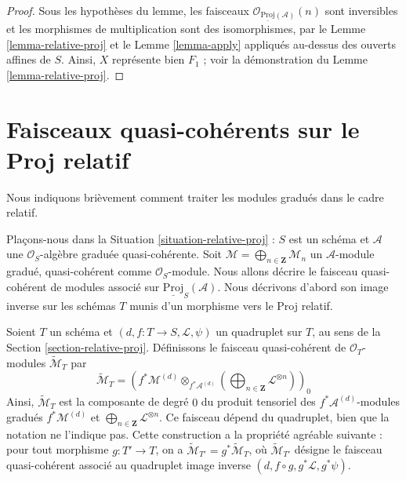 \begin{proof}
Sous les hypothèses du lemme, les faisceaux
$\mathcal{O}_{\underline{\text{Proj}}(\mathcal{A})}(n)$ sont inversibles
et les morphismes de multiplication sont des isomorphismes, par le
Lemme \ref{lemma-relative-proj} et le Lemme \ref{lemma-apply} appliqués
au-dessus des ouverts affines de $S$. Ainsi, $X$ représente bien $F_1$ ;
voir la démonstration du Lemme \ref{lemma-relative-proj}.
\end{proof}











\section{Faisceaux quasi-cohérents sur le Proj relatif}
\label{section-quasi-coherent-relative-proj}

\noindent
Nous indiquons brièvement comment traiter les modules gradués dans le cadre
relatif.

\medskip\noindent
Plaçons-nous dans la Situation \ref{situation-relative-proj} : $S$ est un
schéma et $\mathcal{A}$ une $\mathcal{O}_S$-algèbre graduée quasi-cohérente.
Soit $\mathcal{M} = \bigoplus_{n \in \mathbf{Z}} \mathcal{M}_n$ un
$\mathcal{A}$-module gradué, quasi-cohérent comme $\mathcal{O}_S$-module.
Nous allons décrire le faisceau quasi-cohérent de modules associé sur
$\underline{\text{Proj}}_S(\mathcal{A})$. Nous décrivons d'abord son image
inverse sur les schémas $T$ munis d'un morphisme vers le Proj relatif.

\medskip\noindent
Soient $T$ un schéma et $(d, f : T \to S, \mathcal{L}, \psi)$ un quadruplet
sur $T$, au sens de la Section \ref{section-relative-proj}. Définissons le
faisceau quasi-cohérent de $\mathcal{O}_T$-modules
$\widetilde{\mathcal{M}}_T$ par
\begin{equation}
\label{equation-widetilde-M}
\widetilde{\mathcal{M}}_T =
\left(
f^*\mathcal{M}^{(d)}
\otimes_{f^*\mathcal{A}^{(d)}}
\left(\bigoplus\nolimits_{n \in \mathbf{Z}} \mathcal{L}^{\otimes n}\right)
\right)_0
\end{equation}
Ainsi, $\widetilde{\mathcal{M}}_T$ est la composante de degré $0$ du produit
tensoriel des $f^*\mathcal{A}^{(d)}$-modules gradués
$f^*\mathcal{M}^{(d)}$ et
$\bigoplus\nolimits_{n \in \mathbf{Z}} \mathcal{L}^{\otimes n}$.
Ce faisceau dépend du quadruplet, bien que la notation ne l'indique pas.
Cette construction a la propriété agréable suivante : pour tout morphisme
$g : T' \to T$, on a
$\widetilde{\mathcal{M}}_{T'} = g^*\widetilde{\mathcal{M}}_T$,
où $\widetilde{\mathcal{M}}_{T'}$ désigne le faisceau quasi-cohérent associé
au quadruplet image inverse $(d, f \circ g, g^*\mathcal{L}, g^*\psi)$.

